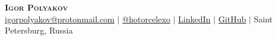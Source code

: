 \documentclass[letterpaper,11pt]{article}
\begin{document}
\begin{center}
  \textbf{\Huge \scshape Igor Polyakov} \\ \vspace{3pt}
    \small
    \faAt \hspace{.5pt} \href{mailto:igorpolyakov@protonmail.com}{igorpolyakov@protonmail.com}
    $|$
    \faTelegram \hspace{.5pt} \href{https://t.me/hotorcelexo}{@hotorcelexo}
    $|$
    \faLinkedinIn \hspace{.5pt} \href{https://www.linkedin.com/in/polyakov-igor-b63497133/}{LinkedIn}
    $|$
    \faGithub \hspace{.5pt} \href{https://github.com/IgorPolyakov}{GitHub}
    $|$
    \faMapPin \hspace{.5pt} Saint Petersburg, Russia
\end{center}

\end{document}

